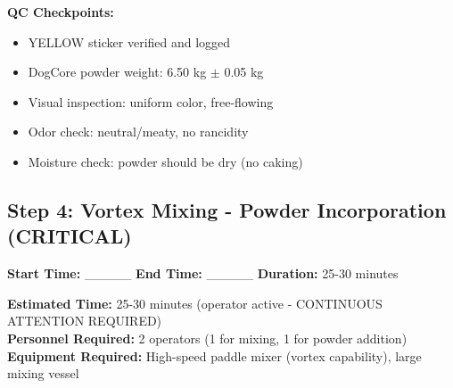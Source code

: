 \textbf{QC Checkpoints:}
\begin{itemize}
\item YELLOW sticker verified and logged
\item DogCore powder weight: 6.50 kg $\pm$ 0.05 kg
\item Visual inspection: uniform color, free-flowing
\item Odor check: neutral/meaty, no rancidity
\item Moisture check: powder should be dry (no caking)
\end{itemize}


\subsection*{Step 4: Vortex Mixing - Powder Incorporation (CRITICAL)}

\textbf{Start Time:} \_\_\_\_\_ \hspace{1cm} \textbf{End Time:} \_\_\_\_\_ \hspace{1cm} \textbf{Duration:} 25-30 minutes

\vspace{0.5em}

\textbf{Estimated Time:} 25-30 minutes (operator active - CONTINUOUS ATTENTION REQUIRED) \\
\textbf{Personnel Required:} 2 operators (1 for mixing, 1 for powder addition) \\
\textbf{Equipment Required:} High-speed paddle mixer (vortex capability), large mixing vessel

\vspace{0.5em}


